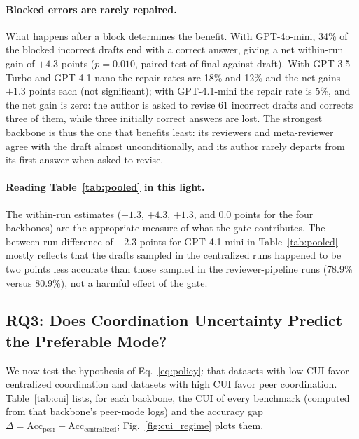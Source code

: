 \documentclass[lettersize,journal]{IEEEtran}
\begin{document}
\paragraph{Blocked errors are rarely repaired.}
What happens after a block determines the benefit.
With GPT-4o-mini, 34\% of the blocked incorrect drafts end with a correct answer, giving a net within-run gain of \(+4.3\) points (\(p=0.010\), paired test of final against draft).
With GPT-3.5-Turbo and GPT-4.1-nano the repair rates are 18\% and 12\% and the net gains \(+1.3\) points each (not significant); with GPT-4.1-mini the repair rate is 5\%, and the net gain is zero: the author is asked to revise 61 incorrect drafts and corrects three of them, while three initially correct answers are lost.
The strongest backbone is thus the one that benefits least: its reviewers and meta-reviewer agree with the draft almost unconditionally, and its author rarely departs from its first answer when asked to revise.

\paragraph{Reading Table~\ref{tab:pooled} in this light.}
The within-run estimates (\(+1.3\), \(+4.3\), \(+1.3\), and \(0.0\) points for the four backbones) are the appropriate measure of what the gate contributes.
The between-run difference of \(-2.3\) points for GPT-4.1-mini in Table~\ref{tab:pooled} mostly reflects that the drafts sampled in the centralized runs happened to be two points less accurate than those sampled in the reviewer-pipeline runs (78.9\% versus 80.9\%), not a harmful effect of the gate.


\subsection{RQ3: Does Coordination Uncertainty Predict the Preferable Mode?}
\label{sec:cui_results}

We now test the hypothesis of Eq.~\eqref{eq:policy}: that datasets with low CUI favor centralized coordination and datasets with high CUI favor peer coordination.
Table~\ref{tab:cui} lists, for each backbone, the CUI of every benchmark (computed from that backbone's peer-mode logs) and the accuracy gap \(\Delta = \mathrm{Acc}_{\mathrm{peer}} - \mathrm{Acc}_{\mathrm{centralized}}\); Fig.~\ref{fig:cui_regime} plots them.
\end{document}

